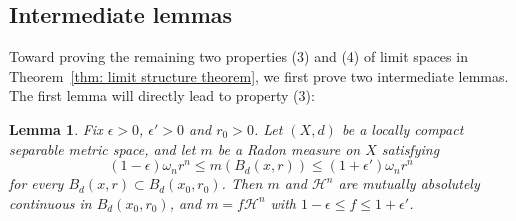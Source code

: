 \documentclass[11pt,reqno]{amsart}
\newtheorem{lemma}[theorem]{Lemma}
\theoremstyle{remark}
\theoremstyle{definition}
\numberwithin{equation}{section}
\newcommand{\e}{{\epsilon}}
\newcommand{\Hi}{{\mathcal{H}}}
\newcommand{\om}{\omega}
\begin{document}
\subsection{Intermediate lemmas}\label{ss:4.2}
Toward proving the remaining two properties (3) and (4) of limit spaces in Theorem~\ref{thm: limit structure theorem}, we first prove two intermediate lemmas. 
The first lemma will directly lead to property (3):
\begin{lemma}\label{lem: measures and densities} Fix $\e>0$, $\e'>0$ and $r_0>0$. 
	Let $(X,d)$ be a locally compact separable metric space, and let $m$ be a Radon measure on $X$ satisfying 
	\begin{equation}\label{eqn: lem volumes close}
		(1-\e)\om_n r^n \leq m(B_d(x,r)) \leq (1+\e')\om_n r^n
	\end{equation}
	for every $B_d(x,r)\subset B_d(x_0,r_0)$. Then $m$ and $\Hi^n$ are mutually absolutely continuous in $B_d(x_0,r_0)$, and $m=f\Hi^n $ with $1-\e\leq f \leq 1+\e'$.
\end{lemma}
\end{document}
